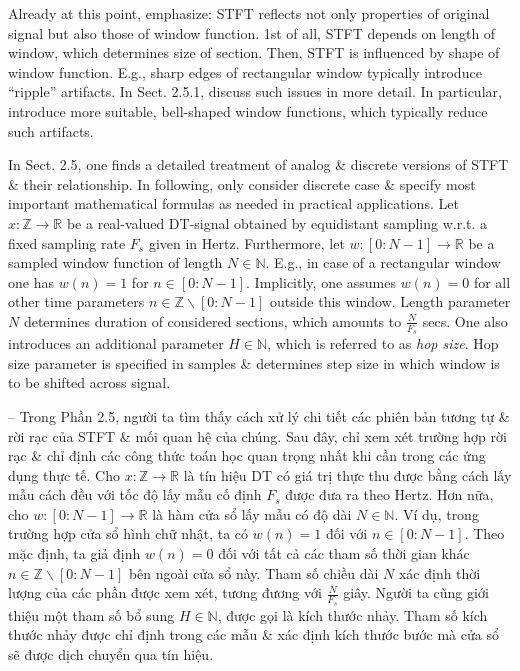 \documentclass{article}
\begin{document}
\begin{itemize}
\begin{itemize}
\begin{itemize}
			Already at this point, emphasize: STFT reflects not only properties of original signal but also those of window function. 1st of all, STFT depends on length of window, which determines size of section. Then, STFT is influenced by shape of window function. E.g., sharp edges of rectangular window typically introduce ``ripple'' artifacts. In Sect. 2.5.1, discuss such issues in more detail. In particular, introduce more suitable, bell-shaped window functions, which typically reduce such artifacts.
			
			In Sect. 2.5, one finds a detailed treatment of analog \& discrete versions of STFT \& their relationship. In following, only consider discrete case \& specify most important mathematical formulas as needed in practical applications. Let $x:\mathbb{Z}\to\mathbb{R}$ be a real-valued DT-signal obtained by equidistant sampling w.r.t. a fixed sampling rate $F_s$ given in Hertz. Furthermore, let $w:[0:N - 1]\to\mathbb{R}$ be a sampled window function of length $N\in\mathbb{N}$. E.g., in case of a rectangular window one has $w(n) = 1$ for $n\in[0:N - 1]$. Implicitly, one assumes $w(n) = 0$ for all other time parameters $n\in\mathbb{Z}\backslash[0:N - 1]$ outside this window. Length parameter $N$ determines duration of considered sections, which amounts to $\frac{N}{F_s}$ secs. One also introduces an additional parameter $H\in\mathbb{N}$, which is referred to as {\it hop size}. Hop size parameter is specified in samples \& determines step size in which window is to be shifted across signal.
			
			-- Trong Phần 2.5, người ta tìm thấy cách xử lý chi tiết các phiên bản tương tự \& rời rạc của STFT \& mối quan hệ của chúng. Sau đây, chỉ xem xét trường hợp rời rạc \& chỉ định các công thức toán học quan trọng nhất khi cần trong các ứng dụng thực tế. Cho $x:\mathbb{Z}\to\mathbb{R}$ là tín hiệu DT có giá trị thực thu được bằng cách lấy mẫu cách đều với tốc độ lấy mẫu cố định $F_s$ được đưa ra theo Hertz. Hơn nữa, cho $w:[0:N - 1]\to\mathbb{R}$ là hàm cửa sổ lấy mẫu có độ dài $N\in\mathbb{N}$. Ví dụ, trong trường hợp cửa sổ hình chữ nhật, ta có $w(n) = 1$ đối với $n\in[0:N - 1]$. Theo mặc định, ta giả định $w(n) = 0$ đối với tất cả các tham số thời gian khác $n\in\mathbb{Z}\backslash[0:N - 1]$ bên ngoài cửa sổ này. Tham số chiều dài $N$ xác định thời lượng của các phần được xem xét, tương đương với $\frac{N}{F_s}$ giây. Người ta cũng giới thiệu một tham số bổ sung $H\in\mathbb{N}$, được gọi là kích thước nhảy. Tham số kích thước nhảy được chỉ định trong các mẫu \& xác định kích thước bước mà cửa sổ sẽ được dịch chuyển qua tín hiệu.
			

\end{itemize}
\end{itemize}
\end{itemize}
\end{document}
